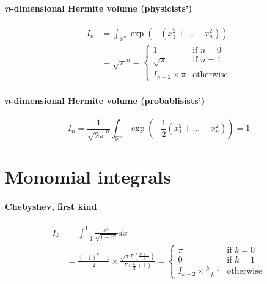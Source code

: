 \documentclass{scrartcl}
\begin{document}
\paragraph{\textit{n}-dimensional Hermite volume (physicists')}
\[
  \begin{split}
  I_n
  &= \int_{\mathbb{R}^n} \exp\left(-(x_1^2+\dots+x_n^2)\right)\\
  &= \sqrt{\pi}^n
   = \begin{cases}
     1&\text{if $n=0$}\\
     \sqrt{\pi}&\text{if $n=1$}\\
     I_{n-2} \times \pi&\text{otherwise}
   \end{cases}
  \end{split}
\]

\paragraph{\textit{n}-dimensional Hermite volume (probablisists')}

\[
  I_n = \frac{1}{\sqrt{2\pi}^n} \int_{\mathbb{R}^n}
  \exp\left(-\frac{1}{2}(x_1^2+\dots+x_n^2)\right) = 1
\]


\section{Monomial integrals}

\paragraph{Chebyshev, first kind}

\[
  \begin{split}
    I_k
    &= \int_{-1}^1 \frac{x^k}{\sqrt{1 - x^2}} dx\\
    &= \frac{(-1)^k + 1}{2} \times \frac{\sqrt{\pi} \Gamma(\frac{k+1}{2})}{\Gamma(\frac{k}{2} + 1)}
    = \begin{cases}
      \pi&\text{if $k = 0$}\\
      0&\text{if $k = 1$}\\
      I_{k-2} \times \frac{k-1}{k}&\text{otherwise}
    \end{cases}
  \end{split}
\]
\end{document}
